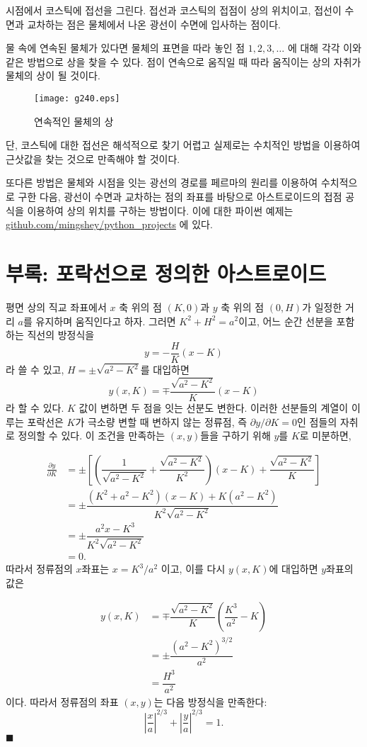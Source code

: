 \documentclass[twocolumn]{article}
\begin{document}
시점에서 코스틱에 접선을 그린다. 접선과 코스틱의 접점이 상의 위치이고, 접선이 수면과 
교차하는 점은 물체에서 나온 광선이 수면에 입사하는 점이다.

물 속에 연속된 물체가 있다면 물체의 표면을 따라 놓인 점 $1, 2, 3, \dots$ 에 대해 
각각 이와 같은 방법으로 상을 찾을 수 있다. 점이 연속으로 움직일 때 따라 움직이는 상의 자취가 
물체의 상이 될 것이다.

\begin{figure}
	\centering
	\texttt{[image: g240.eps]}
	\caption{연속적인 물체의 상}
	\label{fig:extended_image}
\end{figure}

단, 코스틱에 대한 접선은 해석적으로 찾기 어렵고 실제로는 수치적인 방법을 이용하여 
근삿값을 찾는 것으로 만족해야 할 것이다.

또다른 방법은 물체와 시점을 잇는 광선의 경로를 페르마의 원리를 이용하여 수치적으로 
구한 다음, 광선이 수면과 교차하는 점의 좌표를 바탕으로 아스트로이드의 접점 공식을 이용하여
상의 위치를 구하는 방법이다. 이에 대한 파이썬 예제는  
\href{https://github.com/mingshey/python_projects/blob/main/Refraction_Image.ipynb}%
{github.com/mingshey/python\_projects} 에 있다.


\appendix
\newcommand{\pd}[2]{{\frac{\partial #1}{\partial #2}}}
\newcommand{\ilpd}[2]{{{\partial #1}/{\partial #2}}}
\section*{부록: 포락선으로 정의한 아스트로이드}
평면 상의 직교 좌표에서 $x$ 축 위의 점  $(K, 0)$과 $y$ 축 위의 점 $(0, H)$가 일정한 거리 $a$를 유지하며 움직인다고 하자. 그러면 $K^2+H^2=a^2$이고, 어느 순간 선분을 포함하는 직선의 방정식을 
$$y=-\dfrac{H}{K}(x-K)$$
라 쓸 수 있고, $H=\pm \sqrt{a^2-K^2}$를 대입하면 
$$y(x, K) = \mp \dfrac{\sqrt{a^2-K^2}}{K}(x-K)$$
라 할 수 있다. 
$K$ 값이 변하면 두 점을 잇는 선분도 변한다. 이러한 선분들의 계열이 이루는 포락선은 $K$가 극소량 변할 때 변하지 않는 정류점, 즉
$\ilpd{y}{K} = 0$인 점들의 자취로 정의할 수 있다. 이 조건을 만족하는 $(x, y)$들을 구하기 위해 $y$를 $K$로 미분하면,

$$ \begin{aligned}
\pd{y}{K} &= \pm\left[\left( \dfrac{1}{\sqrt{a^2-K^2}}+\dfrac{\sqrt{a^2-K^2}}{K^2}\right) (x-K) + \dfrac{\sqrt{a^2-K^2}}{K} \right]\\
	&= \pm \dfrac{(K^2+a^2-K^2)(x-K)+K(a^2-K^2)}{K^2\sqrt{a^2-K^2}}\\
	&= \pm \dfrac{a^2 x - K^3}{K^2 \sqrt{a^2 - K^2}}\\
	&= 0.
\end{aligned}
$$
따라서 정류점의 $x$좌표는 $x = K^3/a^2$ 이고, 이를 다시 $y(x, K)$에 대입하면 $y$좌표의 값은

$$ \begin{aligned}
y(x, K) &= \mp \dfrac{\sqrt{a^2-K^2}}{K}\left(\dfrac{K^3}{a^2}-K\right)\\
	& = \pm \dfrac{\left( a^2- K^2 \right)^{3/2}}{a^2}\\
	& = \dfrac{H^3}{a^2}
\end{aligned}
$$
이다. 따라서 정류점의 좌표 $(x, y)$는 다음 방정식을 만족한다:
$$ \left|\dfrac{x}{a}\right|^{2/3} + \left|\dfrac{y}{a}\right|^{2/3} = 1. $$
$\blacksquare$
\end{document}
